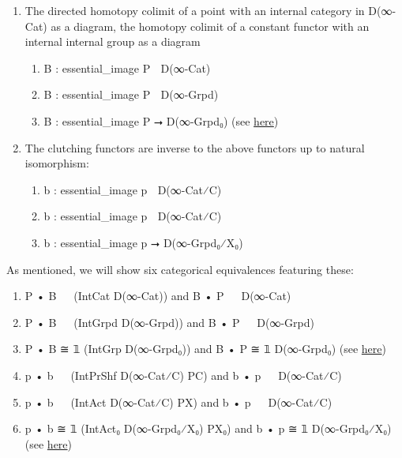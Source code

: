 \documentclass{book}
\theoremstyle{definition}
\begin{document}
\begin{enumerate}
\item The directed homotopy colimit of a point with an internal category in D(∞-Cat) as a diagram, the homotopy colimit of a constant functor with an internal internal group as a diagram
\begin{enumerate}
\item B⃗ : essential\_image P⃗ ⭢ D(∞-Cat)
\item B⃡ : essential\_image P⃡ ⭢ D(∞-Grpd)
\item B : essential\_image P ⭢ D(∞-Grpd₀) (see \href{https://mathoverflow.net/questions/128883/why-omega-x-and-bg-are-adjoint-functors}{here})
\end{enumerate}
\item The clutching functors are inverse to the above functors up to natural isomorphism:
\begin{enumerate}
\item b⃗ : essential\_image p⃗ ⭢ D(∞-Cat⁄C)
\item b⃡ : essential\_image p⃡ ⭢ D(∞-Cat⁄C)
\item b : essential\_image p ⭢ D(∞-Grpd₀⁄X₀) 
\end{enumerate}
\end{enumerate}

As mentioned, we will show six categorical equivalences featuring these:

\begin{enumerate}
\item P⃗ • B⃗ ≅ 𝟙 (IntCat D(∞-Cat)) and B⃗ • P⃗ ≅ 𝟙 D(∞-Cat)
\item P⃡ • B⃡ ≅ 𝟙 (IntGrpd D(∞-Grpd)) and B⃡ • P⃡ ≅ 𝟙 D(∞-Grpd)
\item P • B ≅ 𝟙 (IntGrp D(∞-Grpd₀)) and B • P ≅ 𝟙 D(∞-Grpd₀) (see \href{https://mathoverflow.net/questions/128883/why-omega-x-and-bg-are-adjoint-functors}{here})
\item p⃗ • b⃗ ≅ 𝟙 (IntPrShf D(∞-Cat⁄C) P⃗C) and b⃗ • p⃗ ≅ 𝟙 D(∞-Cat⁄C)
\item p⃡ • b⃡ ≅ 𝟙 (IntAct D(∞-Cat⁄C) P⃡X) and b⃡ • p⃡ ≅ 𝟙 D(∞-Cat⁄C) 
\item p • b ≅ 𝟙 (IntAct₀ D(∞-Grpd₀⁄X₀) PX₀) and b • p ≅ 𝟙 D(∞-Grpd₀⁄X₀) (see \href{https://en.wikipedia.org/wiki/Principal_bundle}{here})
\end{enumerate}
\end{document}
